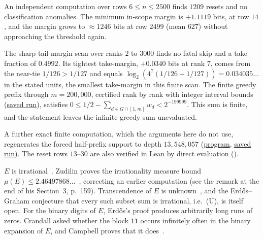 An independent computation over rows $6 \le n \le 2500$ finds $1209$ resets
and no classification anomalies. The minimum in-scope margin is $+1.1119$
bits, at row $14$, and the margin grows to $\approx 1246$ bits at row
$2499$ (mean $627$) without approaching the threshold again.

The sharp tail-margin scan over ranks $2$ to $3000$ finds no fatal skip and
a take fraction of $0.4992$. Its tightest take-margin, $+0.0340$ bits at
rank $7$, comes from the near-tie $1/126>1/127$ and equals
$\log_2(4^7(1/126-1/127))=0.034035\ldots$ in the stated units, the
smallest take-margin in this finite scan. The finite greedy prefix
through $m=200{,}000$, certified rank by rank
with integer interval bounds
(\href{https://github.com/wcook04/plectis-erdos/blob/f757115e03bebe5c04431a147da559015c680a37/research/experiments/erdos257/receipts/greedy-prefix-200000.json}{saved run}),
satisfies
$0\le 1/2-\sum_{d\in G\cap[1,m]}w_d<2^{-199999}$.
This sum is finite, and the statement leaves the infinite greedy sum unevaluated.

A further exact finite computation, which the arguments here do not use,
regenerates the forced half-prefix support to depth $13{,}548{,}057$
(\href{https://github.com/wcook04/plectis-erdos/blob/f757115e03bebe5c04431a147da559015c680a37/research/experiments/erdos257/half_prefix_coefficient_macro_verify.cpp}{program},
\href{https://github.com/wcook04/plectis-erdos/blob/f757115e03bebe5c04431a147da559015c680a37/research/experiments/erdos257/receipts/coefficient-macro-13548057.json}{saved run}).
The reset rows $13$--$30$ are also
verified in Lean by direct evaluation
().

\begin{rem}
$E$ is irrational~\cite{erdos1948}. Zudilin proves the irrationality measure bound
$\mu(E)\le2.46497868\ldots$~\cite[Theorem~1, p.~154]{zudilin2004}, correcting an earlier
computation (see the remark at the end of his Section~3, p.~159). Transcendence of $E$ is
unknown~\cite[p.~2]{duverneytachiya}, and the Erd\H{o}s--Graham conjecture that every such subset
sum is irrational, i.e.\ (U), is itself open. For the binary digits of $E$, Erd\H{o}s's proof
produces arbitrarily long runs of zeros. Crandall asked whether the block \texttt{11} occurs
infinitely often in the binary expansion of $E$, and Campbell proves that it
does~\cite[Theorem~1, p.~12]{campbell2026}.
\end{rem}

